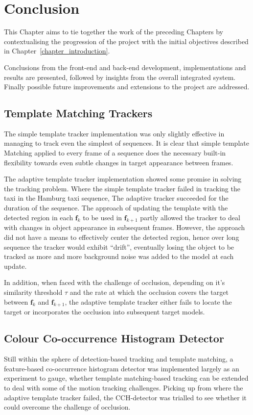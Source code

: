 \chapter{Conclusion}\label{chapter_conclusion}
This Chapter aims to tie together the work of the preceding Chapters
by contextualising the progression of the project with the initial objectives 
described in Chapter~\ref{chapter_introduction}.

Conclusions from the front-end and back-end development, implementations and
results are presented, followed by insights from the overall integrated system.
Finally possible future improvements and extensions to the project are addressed.

\section{Template Matching Trackers}
The simple template tracker implementation was only slightly effective in
managing to track even the simplest of sequences. It is clear that simple template
Matching applied to every frame of a sequence does the necessary built-in
flexibility towards even subtle changes in target appearance between frames.

The adaptive template tracker implementation showed some promise in solving the
tracking problem. Where the simple template tracker failed in tracking the
taxi in the Hamburg taxi sequence, The adaptive tracker succeeded for the
duration of the sequence. 
The approach of updating the template with the detected region in each
$\mathbf{f}_k$ to be used in $\mathbf{f}_{k+1}$ partly allowed the tracker to
deal with changes in object appearance in subsequent frames. However, the
approach did not have a means to effectively center the detected region, hence
over long sequence the tracker would exhibit ``drift'', eventually losing the
object to be tracked as more and more background noise was added to the model at
each update.

In addition, when faced with the challenge of occlusion, depending on it's
similarity threshold $\tau$ and the rate at which the occlusion covers the
target between $\mathbf{f}_k$ and $\mathbf{f}_{k+1}$, the adaptive template
tracker either fails to locate the target or incorporates the occlusion into
subsequent target models.

\section{Colour Co-occurrence Histogram Detector}
Still within the sphere of detection-based tracking and template matching, a
feature-based co-occurrence histogram detector was implemented largely as an
experiment to gauge, whether template matching-based tracking can be extended to deal
with some of the motion tracking challenges. 
Picking up from where the adaptive template tracker failed, the CCH-detector was
trialled to see whether it could overcome the challenge of occlusion.

